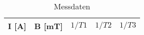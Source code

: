 \documentclass[captions=tableheading]{scrartcl}
\begin{document}


\begin{table}
  \centering
  \caption{Messdaten}
  \label{tab:some_data}
  \begin{tabular}{c c c c c}
    \toprule
     I [A] &		B [mT]	 & $1/T1$ & $1/T2$	&  $1/T3$\\
    \midrule
      
    \bottomrule
  \end{tabular}
\end{table}

\end{document}
